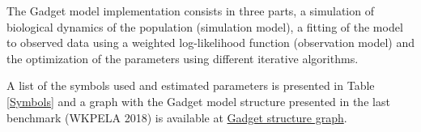 \documentclass[review]{elsarticle}
\begin{document}
 The Gadget model implementation consists in three parts, a simulation of biological dynamics of the population (simulation model), a fitting of the model to observed data using a weighted log-likelihood function (observation model) and the optimization of the parameters using different iterative algorithms.   


A list of the symbols used and estimated parameters is presented in  Table \ref{Symbols} and a graph with the Gadget model structure presented in the last benchmark (WKPELA 2018) is available at \href{http://prezi.com/j8rinhq5kstg/?utm_campaign=share&utm_medium=copy}{Gadget structure graph}.





 




 
 





 
 
 
 
% 
% 
% 
\end{document}
